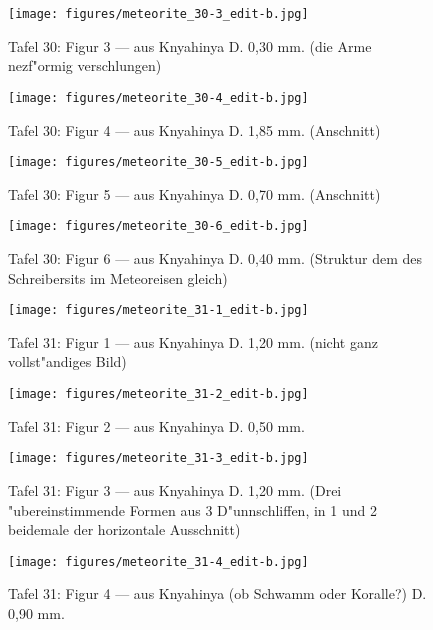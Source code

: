 \documentclass[a4paper, 11pt, oneside]{article}
\begin{document}
\clearpage
\begin{figure}[t]
\texttt{[image: figures/meteorite\_30-3\_edit-b.jpg]}
\caption{Tafel 30: Figur 3 --- aus Knyahinya D. 0,30 mm. (die Arme nezf"ormig verschlungen)}
\centering
\end{figure}
\clearpage
\begin{figure}[t]
\texttt{[image: figures/meteorite\_30-4\_edit-b.jpg]}
\caption{Tafel 30: Figur 4 --- aus Knyahinya D. 1,85 mm. (Anschnitt)}
\centering
\end{figure}
\clearpage
\begin{figure}[t]
\texttt{[image: figures/meteorite\_30-5\_edit-b.jpg]}
\caption{Tafel 30: Figur 5 --- aus Knyahinya D. 0,70 mm. (Anschnitt)}
\centering
\end{figure}
\clearpage
\begin{figure}[t]
\texttt{[image: figures/meteorite\_30-6\_edit-b.jpg]}
\caption{Tafel 30: Figur 6 --- aus Knyahinya D. 0,40 mm. (Struktur dem des Schreibersits im Meteoreisen gleich)}
\centering
\end{figure}
\clearpage
{}
\begin{figure}[t]
\texttt{[image: figures/meteorite\_31-1\_edit-b.jpg]}
\caption{Tafel 31: Figur 1 --- aus Knyahinya D. 1,20 mm. (nicht ganz vollst"andiges Bild)}
\centering
\end{figure}
\clearpage
\begin{figure}[t]
\texttt{[image: figures/meteorite\_31-2\_edit-b.jpg]}
\caption{Tafel 31: Figur 2 --- aus Knyahinya D. 0,50 mm.}
\centering
\end{figure}
\clearpage
\begin{figure}[t]
\texttt{[image: figures/meteorite\_31-3\_edit-b.jpg]}
\caption{Tafel 31: Figur 3 --- aus Knyahinya D. 1,20 mm. (Drei "ubereinstimmende Formen aus 3 D"unnschliffen, in 1 und 2 beidemale der horizontale Ausschnitt)}
\centering
\end{figure}
\clearpage
\begin{figure}[t]
\texttt{[image: figures/meteorite\_31-4\_edit-b.jpg]}
\caption{Tafel 31: Figur 4 --- aus Knyahinya (ob Schwamm oder Koralle?) D. 0,90 mm.}
\centering
\end{figure}
\end{document}
